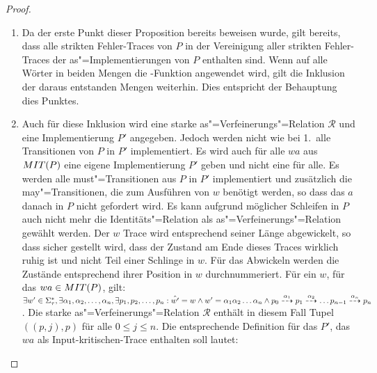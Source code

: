 \begin{proof}
\begin{enumerate}
    \item Da der erste Punkt dieser Proposition bereits beweisen wurde, gilt
      bereits, dass alle strikten Fehler-Traces von $P$ in der Vereinigung
      aller strikten Fehler-Traces der as"=Implementierungen von $P$ enthalten
      sind. Wenn auf alle Wörter in beiden Mengen die \prune{}-Funktion
      angewendet wird, gilt die Inklusion der daraus entstanden Mengen
      weiterhin. Dies entspricht der Behauptung dies Punktes.
    \item Auch für diese Inklusion wird eine starke as"=Verfeinerungs"=Relation
      $\mathcal{R}$ und eine Implementierung $P'$ angegeben. Jedoch werden
      nicht wie bei 1.\ alle Transitionen von $P$ in $P'$ implementiert. Es
      wird auch für alle $wa$ aus $MIT (P)$ eine eigene Implementierung $P'$
      geben und nicht eine für alle. Es werden alle must"=Transitionen aus $P$
      in $P'$ implementiert und zusätzlich die may"=Transitionen, die zum
      Ausführen von $w$ benötigt werden, so dass das $a$ danach in $P$ nicht
      gefordert wird. Es kann aufgrund möglicher Schleifen in $P$ auch nicht
      mehr die Identitäts"=Relation als as"=Verfeinerungs"=Relation gewählt
      werden. Der $w$ Trace wird entsprechend seiner Länge abgewickelt, so dass
      sicher gestellt wird, dass der Zustand am Ende dieses Traces wirklich
      ruhig ist und nicht Teil einer Schlinge in $w$. Für das Abwickeln werden
      die Zustände entsprechend ihrer Position in $w$ durchnummeriert. Für ein
      $w$, für das $wa\in MIT (P)$, gilt: $\exists w'\in\Sigma _{\tau} ^*,
      \exists \alpha _1,\alpha _2,\dots ,\alpha _n, \exists p_1,p_2,\dots ,p_n:
      \hat{w'} = w\land w'=\alpha _1\alpha _2\dots \alpha _n\land p_0
      \may[\alpha _1] p_1 \may[\alpha _2] \dots p_{n-1}\may[\alpha _n] p_n$.
      Die starke as"=Verfeinerungs"=Relation $\mathcal{R}$ enthält in diesem
      Fall Tupel $((p,j),p)$ für alle $0\leq j \leq n$. Die entsprechende
      Definition für das $P'$, das $wa$ als Input-kritischen-Trace enthalten
      soll lautet:
\end{enumerate}
\end{proof}

